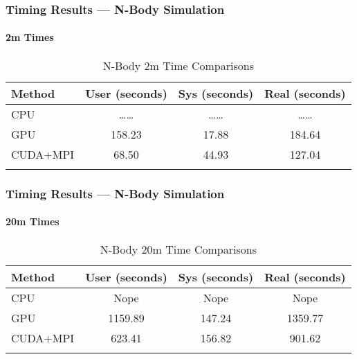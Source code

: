 \documentclass{beamer}
\begin{document}
\begin{frame}
\frametitle{Timing Results --- N-Body Simulation}
\framesubtitle{2m Times}
\begin{table}[htb]
\begin{tabular}{lccc}
\toprule{}
\textbf{Method} & \textbf{User (seconds)} &
\textbf{Sys (seconds)} & \textbf{Real (seconds)} \\
\midrule{}
CPU      & \dots{}\dots{} & \dots{}\dots{} & \dots{}\dots{} \\
\midrule{}
GPU      & 158.23 & 17.88 & 184.64 \\
\midrule{}
CUDA+MPI & 68.50 & 44.93 & 127.04 \\
\bottomrule{}
\end{tabular}
\caption{N-Body 2m Time Comparisons}
\end{table}
\end{frame}
\begin{frame}
\frametitle{Timing Results --- N-Body Simulation}
\framesubtitle{20m Times}
\begin{table}[htb]
\begin{tabular}{lccc}
\toprule{}
\textbf{Method} & \textbf{User (seconds)} &
\textbf{Sys (seconds)} & \textbf{Real (seconds)} \\
\midrule{}
CPU      & Nope & Nope & Nope \\
\midrule{}
GPU      & 1159.89 & 147.24 & 1359.77 \\
\midrule{}
CUDA+MPI & 623.41 & 156.82 & 901.62 \\
\bottomrule{}
\end{tabular}
\caption{N-Body 20m Time Comparisons}
\end{table}
\end{frame}
\end{document}
